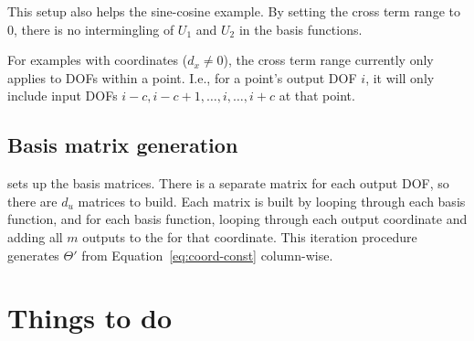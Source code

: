 \documentclass{article}
\def\lstinline#1{}%
\begin{document}
This setup also helps the sine-cosine example. By setting the cross term range
to 0, there is no intermingling of $U_1$ and $U_2$ in the basis functions.

For examples with coordinates ($d_x \ne 0$), the cross term range currently only
applies to DOFs within a point. I.e., for a point's output DOF $i$, it will only
include input DOFs $i-c,i-c+1,\hdots,i,\hdots,i+c$ at that point.

\subsection{Basis matrix generation}

\lstinline{SINDyBasisAddVariables} sets up the basis matrices. There is a
separate matrix for each output DOF, so there are $d_u$ matrices to build.
Each matrix is built by looping through each basis function, and for each basis function,
looping through each output coordinate and adding all $m$ outputs to the for that coordinate.
This iteration procedure generates $\Theta'$ from Equation~\ref{eq:coord-const} column-wise.


\section{Things to do}
\end{document}
